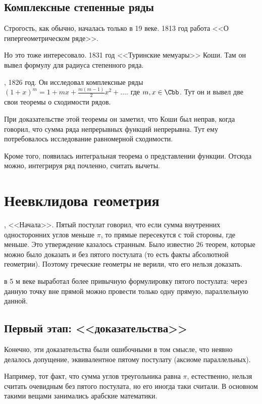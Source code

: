 \documentclass[a4paper,oneside,fleqn,10pt]{article}
\begin{document}
\subsection{Комплексные степенные ряды}

Строгость, как обычно, началась только в 19 веке.  1813 год работа
 <<О гипергеометрическом ряде>>.

Но  это тоже интересовало.  1831 год <<Туринские мемуары>>
Коши. Там он вывел формулу   для
радиуса степенного ряда.

, 1826 год. Он исследовал комплексные ряды $(1 +x )^m = 1
+ mx + \frac{m(m-1)}{2} x^2 + \dots$.  где $m,x \in \Cbb$. Тут он и
вывел две свои теоремы о сходимости рядов.

При доказательстве этой теоремы он заметил, что Коши был неправ, когда
говорил, что сумма ряда непрерывных функций непрерывна. Тут ему
потребовалось исследование равномерной сходимости.

Кроме того, появилась интегральная теорема  о представлении
функции.  Отсюда можно, интегрируя ряд почленно, считать вычеты.


\section{Неевклидова геометрия}

, <<Начала>>. Пятый постулат говорил, что если сумма
внутренних односторонних углов меньше $\pi$, то прямые пересекутся с
той стороны, где меньше.  Это утверждение казалось странным. Было
известно 26 теорем, которые можно было доказать и без пятого постулата
(то есть факты абсолютной геометрии).  Поэтому греческие геометры не
верили, что его нельзя доказать.

 в 5 м веке выработал более привычную формулировку пятого
постулата: через данную точку вне прямой можно провести только одну
прямую, параллельную данной.

\subsection{Первый этап: <<доказательства>>}

Конечно, эти доказательства были ошибочными в том смысле, что неявно
делалось допущение, эквивалентное пятому постулату (аксиоме
параллельных).

Например, тот факт, что сумма углов треугольника равна $\pi$,
естественно, нельзя считать очевидным без пятого постулата, но его
иногда таки считали.  В основном такими вещами занимались арабские
математики.
\end{document}
